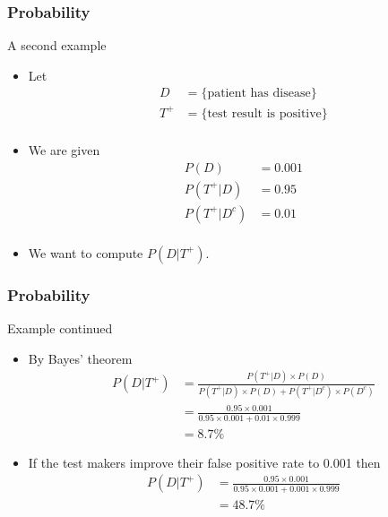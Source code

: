 \documentclass[handout]{beamer}
\begin{document}

   \begin{frame} \frametitle{Probability}

   \begin{block}
   {A second example}

   \begin{itemize}
   \item Let
   $$
   \begin{aligned}
   D &= \{\text{patient has disease}\}     \\
   T^+ &= \{\text{test result is positive}\}     \\
   \end{aligned}
   $$
   \item We are given
   $$
   \begin{aligned}
   P(D) &= 0.001 \\
   P(T^+|D) &= 0.95 \\
   P(T^+|D^c) &= 0.01 \\
   \end{aligned}
   $$
   \item We want to compute $P(D|T^+)$.
   \end{itemize}
   \end{block}
   \end{frame}


   \begin{frame} \frametitle{Probability}

   \begin{block}
   {Example continued}

   \begin{itemize}
     \item By Bayes' theorem
   $$
   \begin{aligned}
   P(D|T^+) &= \frac{P(T^+|D) \times P(D)}{P(T^+|D) \times P(D) + P(T^+|D^c) \times P(D^c)} \\
   &= \frac{0.95 \times 0.001}{0.95 \times 0.001 + 0.01 \times 0.999} \\
   &= 8.7 \%
   \end{aligned}
   $$

   \item If the test makers improve their false positive rate to 0.001 then
   $$
   \begin{aligned}
   P(D|T^+)
   &= \frac{0.95 \times 0.001}{0.95 \times 0.001 + 0.001 \times 0.999} \\
   &= 48.7 \%
   \end{aligned}
   $$
   \end{itemize}
   \end{block}
   \end{frame}


   \begin{frame} 

   \end{frame}

   
\end{document}
